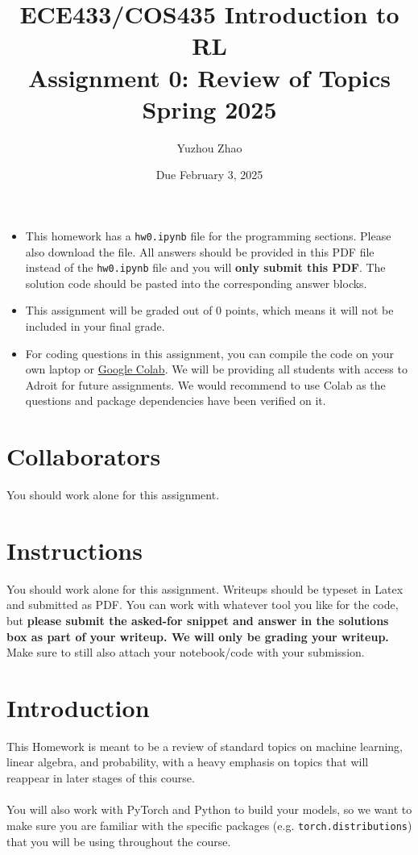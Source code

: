 \documentclass[12pt]{article}
\title{ECE433/COS435 Introduction to RL\\
  Assignment 0: Review of Topics\\
  Spring 2025\\
}
\date{Due February 3, 2025}
\author{\begin{fillme}[width=0.3\textwidth]
Yuzhou Zhao
\end{fillme}} %
\begin{document}
\maketitle
\noindent

\begin{itemize}
    \item This homework has a \texttt{hw0.ipynb} file for the programming sections. Please also download the file. All answers should be provided in this PDF file instead of the \texttt{hw0.ipynb} file and you will \textbf{only submit this PDF}. The solution code should be pasted into the corresponding answer blocks.
    \item This assignment will be graded out of 0 points, which means it will not be included in your final grade.
    \item For coding questions in this assignment, you can compile the code on your own laptop or \href{https://colab.research.google.com/}{Google Colab}. We will be providing all students with access to Adroit for future assignments. We would recommend to use Colab as the questions and package dependencies have been verified on it.
\end{itemize}

\newpage
\section*{Collaborators}
\begin{fillme}
You should work alone for this assignment.
\end{fillme}

\section*{Instructions}

You should work alone for this assignment. Writeups should be typeset in Latex and submitted as PDF. You can work with whatever tool you like for the code, but \textbf{please submit the asked-for snippet and answer in the solutions box as part of your writeup. We will only be grading your writeup.} Make sure to still also attach your notebook/code with your submission.

\section*{Introduction}
This Homework is meant to be a review of standard topics on machine learning, linear algebra, and probability, with a heavy emphasis on topics that will reappear in later stages of this course. 
\\\\
You will also work with PyTorch and Python to build your models, so we want to make sure you are familiar with the specific packages (e.g. \texttt{torch.distributions}) that you will be using throughout the course.
\newpage
\end{document}
